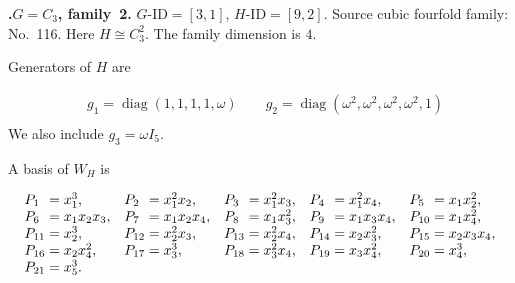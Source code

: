 \documentclass[12pt]{amsart}
\makeatletter
\numberwithin{equation}{section}
\theoremstyle{plain}
\theoremstyle{definition}
\theoremstyle{remark}
\DeclareMathOperator{\diag}{diag}
\newcommand{\PBasisLabel}[1]{\mathrlap{P_{#1}}\phantom{P_{99}}}
\newenvironment{SecEightAlignedBasis}[1]{%
  \begingroup\renewcommand{\arraystretch}{1.18}%
  \[\begin{array}{@{}#1@{}}%
}{\end{array}\]\endgroup}
\newenvironment{familydisplay}{%
  \begingroup
  \setlength{\arraycolsep}{1.35pt}%
  \renewcommand{\arraystretch}{0.96}%
  \setlength{\jot}{2pt}%
}{\endgroup}
\makeatother
\begin{document}
\par{}\medskip\noindent\textbf{.\enspace $G=C_3$, family~2.}\label{fam:threefold-no-29}
$G\text{-ID}=[3,1]$, $H\text{-ID}=[9,2]$.
Source cubic fourfold family: No.~116.  Here
$H\cong C_3^2$.
The family dimension is $4$.
\par\smallskip\noindent Generators of $H$ are\par\nopagebreak
\begin{familydisplay}
\begin{align*}
&g_{1}=\diag(1,1,1,1,\omega)
\qquad g_{2}=\diag(\omega^2,\omega^2,\omega^2,\omega^2,1)\\
\end{align*}
\end{familydisplay}
\noindent We also include $g_{3}=\omega I_5$.
\par\smallskip\noindent A basis of $W_H$ is\par\nopagebreak
\begin{familydisplay}
\begin{SecEightAlignedBasis}{l@{\quad}l@{\quad}l@{\quad}l@{\quad}l}
\PBasisLabel{1}=x_{1}^{3}, & \PBasisLabel{2}=x_{1}^{2}x_{2}, & \PBasisLabel{3}=x_{1}^{2}x_{3}, & \PBasisLabel{4}=x_{1}^{2}x_{4}, & \PBasisLabel{5}=x_{1}x_{2}^{2},\\
\PBasisLabel{6}=x_{1}x_{2}x_{3}, & \PBasisLabel{7}=x_{1}x_{2}x_{4}, & \PBasisLabel{8}=x_{1}x_{3}^{2}, & \PBasisLabel{9}=x_{1}x_{3}x_{4}, & \PBasisLabel{10}=x_{1}x_{4}^{2},\\
\PBasisLabel{11}=x_{2}^{3}, & \PBasisLabel{12}=x_{2}^{2}x_{3}, & \PBasisLabel{13}=x_{2}^{2}x_{4}, & \PBasisLabel{14}=x_{2}x_{3}^{2}, & \PBasisLabel{15}=x_{2}x_{3}x_{4},\\
\PBasisLabel{16}=x_{2}x_{4}^{2}, & \PBasisLabel{17}=x_{3}^{3}, & \PBasisLabel{18}=x_{3}^{2}x_{4}, & \PBasisLabel{19}=x_{3}x_{4}^{2}, & \PBasisLabel{20}=x_{4}^{3},\\
\multicolumn{5}{@{}l@{}}{\PBasisLabel{21}=x_{5}^{3}.}
\end{SecEightAlignedBasis}
\end{familydisplay}
\end{document}
